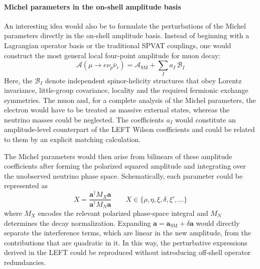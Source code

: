 \paragraph*{Michel parameters in the on-shell amplitude basis}
An interesting idea would also be to formulate the perturbations of the Michel parameters directly in the on-shell amplitude basis. Instead of beginning with a Lagrangian operator basis or the traditional SPVAT couplings, one would construct the most general local
four-point amplitude for muon decay:
\begin{equation}
    \mathcal A\!\left(\mu\to e\nu_p\bar\nu_r\right)
    = \mathcal A_{\mathrm{SM}}
    + \sum_I a_I\,\mathcal B_I
    \label{eq:outlook-onshell-amplitude}
\end{equation}
Here, the $\mathcal B_I$ denote independent spinor-helicity structures that
obey Lorentz invariance, little-group covariance, locality and the required
fermionic exchange symmetries. The muon and, for a complete analysis of the
Michel parameters, the electron would have to be treated as massive external
states, whereas the neutrino masses could be neglected. The coefficients
$a_I$ would constitute an amplitude-level counterpart of the LEFT Wilson
coefficients and could be related to them by an explicit matching calculation.

The Michel parameters would then arise from bilinears of these amplitude
coefficients after forming the polarized squared amplitude and integrating
over the unobserved neutrino phase space. Schematically, each parameter could
be represented as
\begin{equation}
    X
    = \frac{\boldsymbol a^{\dagger} M_X\boldsymbol a}
           {\boldsymbol a^{\dagger} M_N\boldsymbol a}
    \qquad
    X\in\{\rho,\eta,\xi,\delta,\xi',\ldots\}
    \label{eq:outlook-michel-bilinear}
\end{equation}
where $M_X$ encodes the relevant polarized phase-space integral and $M_N$
determines the decay normalization. Expanding
$\boldsymbol a=\boldsymbol a_{\mathrm{SM}}+\delta\boldsymbol a$ would directly
separate the interference terms, which are linear in the new amplitude, from
the contributions that are quadratic in it. In this way, the perturbative
expressions derived in the LEFT could be reproduced without introducing
off-shell operator redundancies.

